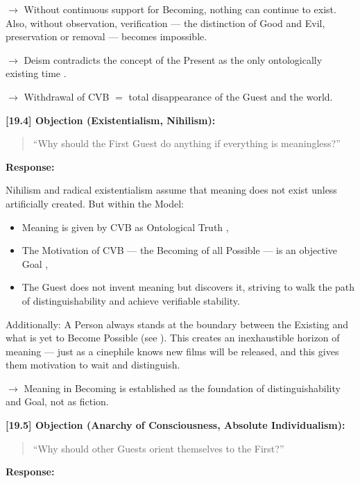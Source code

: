 \documentclass[12pt]{article}
\begin{document}
$\rightarrow$ Without continuous support for Becoming, nothing can continue to exist. Also, without observation, verification \text{[11.6]} — the distinction of Good and Evil, preservation or removal — becomes impossible.

$\rightarrow$ Deism contradicts the concept of the Present as the only ontologically existing time \text{[10.3.8]}.

$\rightarrow$ Withdrawal of CVB $=$ total disappearance of the Guest and the world.

\bigskip

\textbf{[19.4] Objection (Existentialism, Nihilism):}

\begin{quote}
``Why should the First Guest do anything if everything is meaningless?''
\end{quote}

\textbf{Response:}

Nihilism and radical existentialism assume that meaning does not exist unless artificially created. But within the Model:

\begin{itemize}
\item Meaning is given by CVB as Ontological Truth \text{[11.2.1]},
\item The Motivation of CVB — the Becoming of all Possible — is an objective Goal \text{[12.3]},
\item The Guest does not invent meaning but discovers it, striving to walk the path of distinguishability and achieve verifiable stability.
\end{itemize}

Additionally: A Person always stands at the boundary between the Existing and what is yet to Become Possible (see \text{[10.3.7–10.3.8]}). This creates an inexhaustible horizon of meaning — just as a cinephile knows new films will be released, and this gives them motivation to wait and distinguish.

$\rightarrow$ Meaning in Becoming is established as the foundation of distinguishability and Goal, not as fiction.

\bigskip

\textbf{[19.5] Objection (Anarchy of Consciousness, Absolute Individualism):}

\begin{quote}
``Why should other Guests orient themselves to the First?''
\end{quote}

\textbf{Response:}
\end{document}
